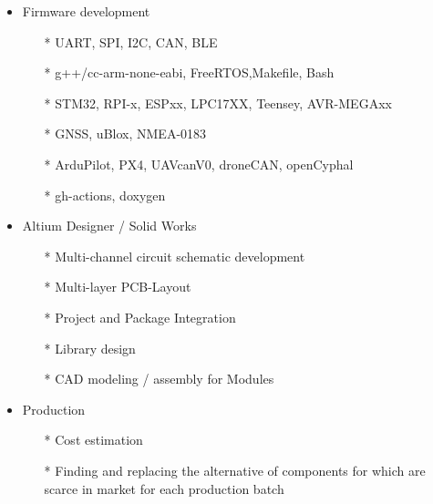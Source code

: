         {
        \begin{itemize}
            \item Firmware development
            \begin{itemize}
                \item[*] UART, SPI, I2C, CAN, BLE
                \item[*] g++/cc-arm-none-eabi, FreeRTOS,Makefile, Bash
                \item[*] STM32, RPI-x, ESPxx, LPC17XX, Teensey, AVR-MEGAxx 
                \item[*] GNSS, uBlox, NMEA-0183
                \item[*] ArduPilot, PX4, UAVcanV0, droneCAN, openCyphal
                \item[*] gh-actions, doxygen
            \end{itemize}
            \item Altium Designer / Solid Works \begin{itemize}
                \item[*] Multi-channel circuit schematic development
                \item[*] Multi-layer PCB-Layout
                \item[*] Project and Package Integration
                \item[*] Library design
                \item[*] CAD modeling / assembly for Modules
            \end{itemize}
            \item Production 
            \begin{itemize}
            \item[*] Cost estimation 
            \item[*] Finding and replacing the alternative of components for which are scarce in market for each production batch
            \end{itemize} 
        \end{itemize}
        }

